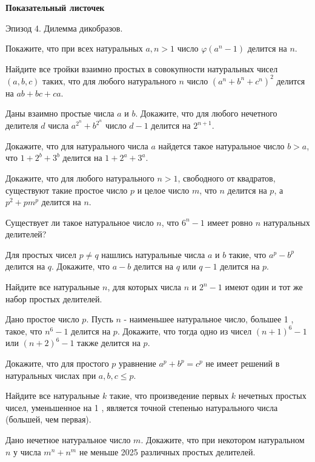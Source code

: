 \centerline{\bf \Huge Показательный листочек}

\begin{flushright}
        \scriptsize{Эпизод 4. Дилемма дикобразов.}
\end{flushright}

Покажите, что при всех натуральных $a, n>1$ число $\varphi\left(a^n-1\right)$ делится на $n$.

Найдите все тройки взаимно простых в совокупности натуральных чисел $(a, b, c)$ таких, что для любого натурального $n$ число $\left(a^n+b^n+c^n\right)^2$ делится на $a b+b c+c a$.

Даны взаимно простые числа $a$ и $b$. Докажите, что для любого нечетного делителя $d$ числа $a^{2^n}+b^{2^n}$ число $d-1$ делится на $2^{n+1}$.

Докажите, что для натурального числа $a$ найдется такое натуральное число $b>a$, что $1+2^b+3^b$ делится на $1+2^a+3^a$.

Докажите, что для любого натурального $n>1$, свободного от квадратов, существуют такие простое число $p$ и целое число $m$, что $n$ делится на $p$, а $p^2+p m^p$ делится на $n$.

Существует ли такое натуральное число $n$, что $6^n-1$ имеет ровно $n$ натуральных делителей?

Для простых чисел $p \neq q$ нашлись натуральные числа $a$ и $b$ такие, что $a^p-b^p$ делится на $q$. Докажите, что $a-b$ делится на $q$ или $q-1$ делится на $p$.

Найдите все натуральные $n$, для которых числа $n$ и $2^n-1$ имеют один и тот же набор простых делителей.

Дано простое число $p$. Пусть $n$ - наименьшее натуральное число, большее 1 , такое, что $n^6-1$ делится на $p$. Докажите, что тогда одно из чисел $(n+1)^6-1$ или $(n+2)^6-1$ также делится на $p$.

Докажите, что для простого $p$ уравнение $a^p+b^p=c^p$ не имеет решений в натуральных числах при $a, b, c \leqslant p$.

Найдите все натуральные $k$ такие, что произведение первых $k$ нечетных простых чисел, уменьшенное на 1 , является точной степенью натурального числа (большей, чем первая).

Дано нечетное натуральное число $m$. Докажите, что при некотором натуральном $n$ у числа $m^n+n^m$ не меньше 2025 различных простых делителей.
